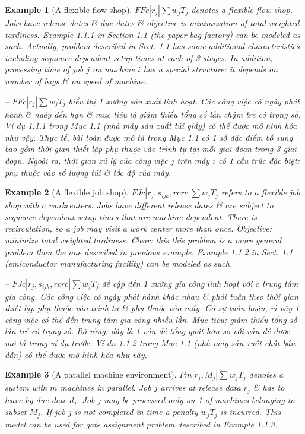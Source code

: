 \documentclass{article}
\newtheorem{example}{Example}
\begin{document}
\begin{itemize}
\begin{itemize}
        \begin{example}[A flexible flow shop]
            $FFc|r_j|\sum w_jT_j$ denotes a flexible flow shop. Jobs have release dates \& due dates \& objective is minimization of total weighted tardiness. Example 1.1.1 in Section 1.1 (the paper bag factory) can be modeled as such. Actually, problem described in Sect. 1.1 has some additional characteristics including sequence dependent setup times at each of 3 stages. In addition, processing time of job $j$ on machine $i$ has a special structure: it depends on number of bags \& on speed of machine.

            -- $FFc|r_j|\sum w_jT_j$ biểu thị 1 xưởng sản xuất linh hoạt. Các công việc có ngày phát hành \& ngày đến hạn \& mục tiêu là giảm thiểu tổng số lần chậm trễ có trọng số. Ví dụ 1.1.1 trong Mục 1.1 (nhà máy sản xuất túi giấy) có thể được mô hình hóa như vậy. Thực tế, bài toán được mô tả trong Mục 1.1 có 1 số đặc điểm bổ sung bao gồm thời gian thiết lập phụ thuộc vào trình tự tại mỗi giai đoạn trong 3 giai đoạn. Ngoài ra, thời gian xử lý của công việc $j$ trên máy $i$ có 1 cấu trúc đặc biệt: phụ thuộc vào số lượng túi \& tốc độ của máy.
        \end{example}

        \begin{example}[A flexible job shop]
            $FJc|r_j,s_{ijk},rcrc|\sum w_jT_j$ refers to a flexible job shop with $c$ workcenters. Jobs have different release dates \& are subject to sequence dependent setup times that are machine dependent. There is recirculation, so a job may visit a work center more than once. Objective: minimize total weighted tardiness. Clear: this this problem is a more general problem than the one described in previous example. Example 1.1.2 in Sect. 1.1 (emiconductor manufacturing facility) can be modeled as such.

            -- $FJc|r_j,s_{ijk},rcrc|\sum w_jT_j$ đề cập đến 1 xưởng gia công linh hoạt với $c$ trung tâm gia công. Các công việc có ngày phát hành khác nhau \& phải tuân theo thời gian thiết lập phụ thuộc vào trình tự \& phụ thuộc vào máy. Có sự tuần hoàn, vì vậy 1 công việc có thể đến trung tâm gia công nhiều lần. Mục tiêu: giảm thiểu tổng số lần trễ có trọng số. Rõ ràng: đây là 1 vấn đề tổng quát hơn so với vấn đề được mô tả trong ví dụ trước. Ví dụ 1.1.2 trong Mục 1.1 (nhà máy sản xuất chất bán dẫn) có thể được mô hình hóa như vậy.
        \end{example}

        \begin{example}[A parallel machine environment]
            $Pm|r_j,M_j|\sum w_jT_j$ denotes a system with $m$ machines in parallel. Job $j$ arrives at release data $r_j$ \& has to leave by due date $d_j$. Job $j$ may be processed only on 1 of machines belonging to subset $M_j$. If job $j$ is not completed in time a penalty $w_jT_j$ is incurred. This model can be used for gate assignment problem described in Example 1.1.3.


\end{example}
\end{itemize}
\end{itemize}
\end{document}
